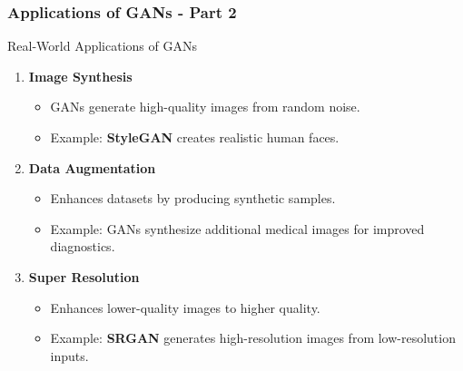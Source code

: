 \documentclass[aspectratio=169]{beamer}
\begin{document}
\begin{frame}[fragile]
    \frametitle{Applications of GANs - Part 2}
    \begin{block}{Real-World Applications of GANs}
        \begin{enumerate}
            \item \textbf{Image Synthesis}
                \begin{itemize}
                    \item GANs generate high-quality images from random noise.
                    \item Example: \textbf{StyleGAN} creates realistic human faces.
                \end{itemize}
            \item \textbf{Data Augmentation}
                \begin{itemize}
                    \item Enhances datasets by producing synthetic samples.
                    \item Example: GANs synthesize additional medical images for improved diagnostics.
                \end{itemize}
            \item \textbf{Super Resolution}
                \begin{itemize}
                    \item Enhances lower-quality images to higher quality.
                    \item Example: \textbf{SRGAN} generates high-resolution images from low-resolution inputs.
                \end{itemize}
        \end{enumerate}
    \end{block}
\end{frame}
\end{document}
